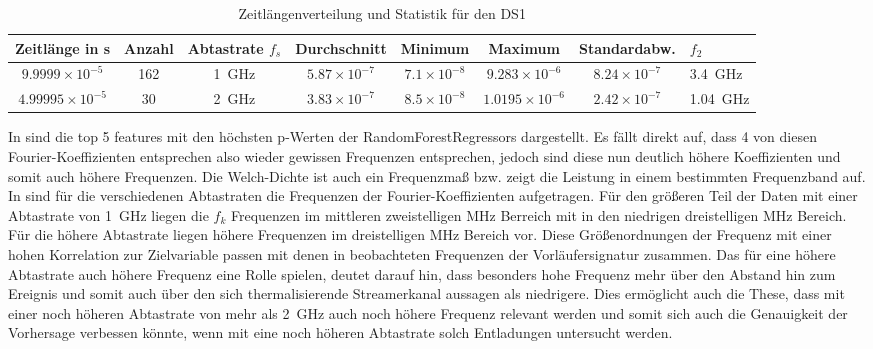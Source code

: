 \begin{table}[h!]
\centering
\begin{tabular}{|c|c|c|c|c|c|c|}
\hline
\textbf{Zeitlänge in s} & \textbf{Anzahl} & \textbf{Abtastrate} $f_s$ & \textbf{Durchschnitt} & \textbf{Minimum} & \textbf{Maximum} & \textbf{Standardabw.}  & \(f_2\)\\
\hline
$9.9999 \times 10^{-5}$  & 162 & \SI{1}{\giga\hertz} & $5.87 \times 10^{-7}$ & $7.1 \times 10^{-8}$ & $9.283 \times 10^{-6}$ & $8.24 \times 10^{-7}$ & \SI{3,4}{\giga\hertz}\\
$4.99995 \times 10^{-5}$ & 30  & \SI{2}{\giga\hertz} & $3.83 \times 10^{-7}$ & $8.5 \times 10^{-8}$ & $1.0195 \times 10^{-6}$ & $2.42 \times 10^{-7}$ & \SI{1,04}{\giga\hertz}\\
\hline
\end{tabular}
\caption{Zeitlängenverteilung und Statistik für den DS1}
\label{tab:ds1-sample}
\end{table}

In  sind die top 5 features mit den höchsten p-Werten der RandomForestRegressors dargestellt. Es fällt direkt auf, dass 4 von diesen Fourier-Koeffizienten entsprechen also wieder gewissen Frequenzen entsprechen, jedoch sind diese nun deutlich höhere Koeffizienten und somit auch höhere Frequenzen. Die Welch-Dichte ist auch ein Frequenzmaß bzw. zeigt die Leistung in einem bestimmten Frequenzband auf. In  sind für die verschiedenen Abtastraten die Frequenzen der Fourier-Koeffizienten aufgetragen. Für den größeren Teil der Daten mit einer Abtastrate von \SI{1}{\giga\hertz} liegen die \(f_k\) Frequenzen im mittleren zweistelligen MHz Berreich mit in den niedrigen dreistelligen MHz Bereich. Für die höhere Abtastrate liegen höhere Frequenzen im dreistelligen MHz Bereich vor. Diese Größenordnungen der Frequenz mit einer hohen Korrelation zur Zielvariable passen mit denen in  beobachteten Frequenzen der Vorläufersignatur zusammen. Das für eine höhere Abtastrate auch höhere Frequenz eine Rolle spielen, deutet darauf hin, dass besonders hohe Frequenz mehr über den Abstand hin zum Ereignis und somit auch über den sich thermalisierende Streamerkanal aussagen als niedrigere. Dies ermöglicht auch die These, dass mit einer noch höheren Abtastrate von mehr als \SI{2}{\giga\hertz} auch noch höhere Frequenz relevant werden und somit sich auch die Genauigkeit der Vorhersage verbessen könnte, wenn mit eine noch höheren Abtastrate solch Entladungen untersucht werden. 


